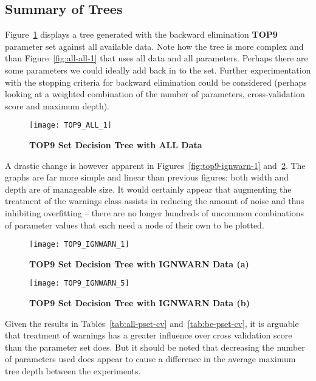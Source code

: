 \subsection{Summary of Trees}

Figure~\ref{fig:top9-all-1} displays a tree generated with the backward
elimination \textbf{TOP9} parameter set against all available data. Note how the
tree is more complex and than Figure~\ref{fig:all-all-1} that uses all data and
all parameters. Perhaps there are some parameters we could ideally add back in
to the set. Further experimentation with the stopping criteria for backward
elimination could be considered (perhaps looking at a weighted combination
of the number of parameters, cross-validation score and maximum depth).

\begin{figure}[htbp!]
    \centering
    \texttt{[image: TOP9\_ALL\_1]}
    \caption[top9-all-1]{\textbf{TOP9 Set Decision Tree with ALL Data}}
    \label{fig:top9-all-1}
\end{figure}


A drastic change is however apparent in Figures~\ref{fig:top9-ignwarn-1}
and~\ref{fig:top9-ignwarn-2}. The graphs are far more simple and linear than
previous figures; both width and depth are of manageable size. It would
certainly appear that augmenting the treatment of the warnings class assists in
reducing the amount of noise and thus inhibiting overfitting -- there are no
longer hundreds of uncommon combinations of parameter values that each need a
node of their own to be plotted.


\begin{figure}[htbp!]
    \centering
    \texttt{[image: TOP9\_IGNWARN\_1]}
    \caption[top9-ignwarn-1]{\textbf{TOP9 Set Decision Tree with IGNWARN Data
    (a)}}
    \label{fig:top9-ignwarn-1}

    \vspace{10mm}

    \texttt{[image: TOP9\_IGNWARN\_5]}
    \caption[top9-ignwarn-2]{\textbf{TOP9 Set Decision Tree with IGNWARN Data
    (b)}}
    \label{fig:top9-ignwarn-2}
\end{figure}


Given the results in Tables~\ref{tab:all-pset-cv} and~\ref{tab:be-pset-cv}, it
is arguable that treatment of warnings has a greater influence over cross
validation score than the parameter set does. But it should be noted that
decreasing the number of parameters used does appear to cause a difference in
the average maximum tree depth between the experiments.


